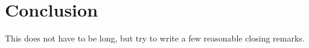 \section{Conclusion}\label{sec:conclusion}
This does not have to be long, but try to write a few reasonable closing remarks.
